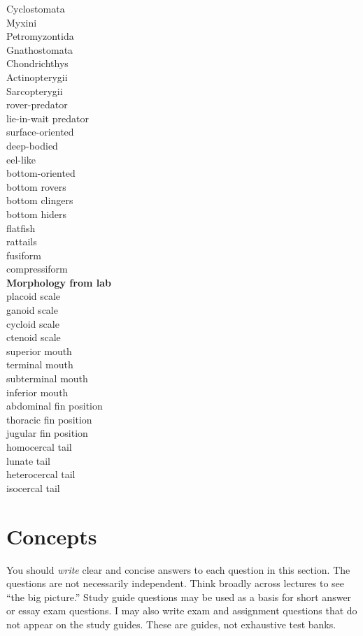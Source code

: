 \documentclass[letterpaper]{tufte-handout}
\begin{document}
\begin{multicols}{2}
Cyclostomata\\
Myxini \\
Petromyzontida \\
Gnathostomata \\
Chondrichthys\\
Actinopterygii\\
Sarcopterygii\\
rover-predator \\
lie-in-wait predator \\
surface-oriented \\
deep-bodied \\
eel-like \\
bottom-oriented \\
bottom rovers \\
bottom clingers \\
bottom hiders \\
flatfish \\
rattails \\
fusiform \\
compressiform  \\
\columnbreak\textbf{Morphology from lab} \\
placoid scale \\
ganoid scale \\
cycloid scale \\
ctenoid scale \\
superior mouth  \\
terminal mouth  \\
subterminal mouth  \\
inferior mouth  \\
abdominal fin position \\
thoracic fin position \\
jugular fin position \\
homocercal tail \\
lunate tail \\
heterocercal tail \\
isocercal tail 
\end{multicols}

\section{Concepts}

You should \emph{write} clear and concise answers to each question in this section.  The questions are not necessarily independent.  Think broadly across lectures to see ``the big picture.''  Study guide questions may be used as a basis for short answer or essay exam questions. I may also write exam and assignment questions that do not appear on the study guides. These are guides, not exhaustive test banks.
\end{document}
